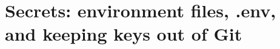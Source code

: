 \chapter{Secrets: environment files, .env, and keeping keys out of Git}
\label{ch:secrets-environment-files-env-and}

